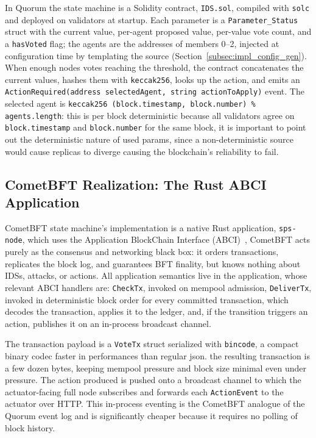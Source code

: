 In Quorum the state machine is a Solidity contract, \texttt{IDS.sol}, compiled with \texttt{solc} and deployed on validators at startup. Each parameter is a \texttt{Parameter\_Status} struct with the current value, per-agent proposed value, per-value vote count, and a \texttt{hasVoted} flag; the agents are the addresses of members 0--2, injected at configuration time by templating the source (Section~\ref{subsec:impl_config_gen}).
When enough nodes votes reaching the threshold, the contract concatenates the current values, hashes them with \texttt{keccak256}, looks up the action, and emits an \texttt{ActionRequired(address selectedAgent, string actionToApply)} event. The selected agent is \texttt{keccak256 (block.timestamp, block.number) \% agents.length}: this is per block deterministic  because all validators agree on \texttt{block.timestamp} and \texttt{block.number} for the same block, it is important to point out the deterministic nature of used params, since a non-deterministic source would cause replicas to diverge causing the blockchain's reliability to fail.

\subsection{CometBFT Realization: The Rust ABCI Application}
\label{subsec:impl_cometbft_app}

CometBFT state machine's implementation is a native Rust application, \texttt{sps-node}, which uses the Application BlockChain Interface (ABCI)~\cite{abciOverview}, CometBFT acts purely as the consensus and networking black box: it orders transactions, replicates the block log, and guarantees BFT finality, but knows nothing about IDSs, attacks, or actions. All application semantics live in the application, whose relevant ABCI handlers are: \texttt{CheckTx}, invoked on mempool admission, \texttt{DeliverTx}, invoked in deterministic block order for every committed transaction, which decodes the transaction, applies it to the ledger, and, if the transition triggers an action, publishes it on an in-process broadcast channel.

The transaction payload is a \texttt{VoteTx} struct serialized with \texttt{bincode}, a compact binary codec faster in performances than regular json. the resulting transaction is a few dozen bytes, keeping mempool pressure and block size minimal even under pressure. The action produced is pushed onto a broadcast channel to which the actuator-facing full node subscribes and forwards each \texttt{ActionEvent} to the actuator over HTTP. This in-process eventing is the CometBFT analogue of the Quorum event log and is significantly cheaper because it requires no polling of block history.


